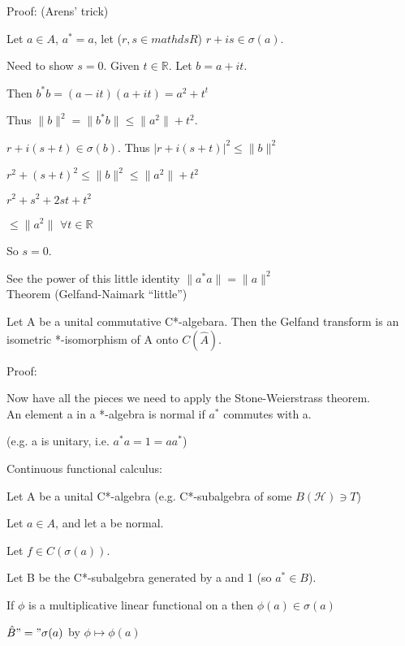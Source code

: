 \documentclass[12pt]{article}
\newcommand{\conj}{^*}
\newcommand{\sq}{^2}
\begin{document}
\noindent
Proof: (Arens' trick)

Let $a \in A$, $a\conj = a$, let ($r, s \in mathds{R}$) $r + is \in \sigma(a)$.

Need to show $s = 0$.  Given $t \in \mathds{R}$.  Let $b = a + it$.

Then $b\conj b = (a - it)(a + it) = a^2 + t^t$

Thus $\|b\|^2 = \|b\conj b\| \leq \|a\sq\| + t\sq$.

$r + i(s + t) \in \sigma(b)$.  Thus $|r + i(s + t)|\sq \leq \|b\|\sq$

$r\sq + (s + t)\sq \leq \|b\|\sq \leq \|a\sq\| + t\sq$

$r\sq + s\sq + 2st + t\sq$

$\leq \|a\sq\|$ $\forall t \in \mathds{R}$

So $s = 0$.

See the power of this little identity $\|a\conj a\|=\|a\|\sq$\\

\noindent
Theorem (Gelfand-Naimark ``little'')

Let A be a unital commutative C*-algebara.  Then the Gelfand transform is an isometric *-isomorphism of A onto $C(\hat{A})$.

\noindent
Proof:

Now have all the pieces we need to apply the Stone-Weierstrass theorem.\\

\noindent
An element a in a *-algebra is normal if $a\conj$ commutes with a.

(e.g. a is unitary, i.e. $a\conj a = 1 = aa\conj$)

\noindent
Continuous functional calculus:

Let A be a unital C*-algebra (e.g. C*-subalgebra of some $B(\mathcal{H}) \ni T$)

Let $a \in A$, and let a be normal.

Let $f \in C(\sigma(a))$.

Let B be the C*-subalgebra generated by a and 1 (so $a\conj \in B$).

If $\phi$ is a multiplicative linear functional on a then $\phi(a) \in \sigma(a)$

$\hat{B} "=" \sigma(a)$ by $\phi \mapsto \phi(a)$
\end{document}
